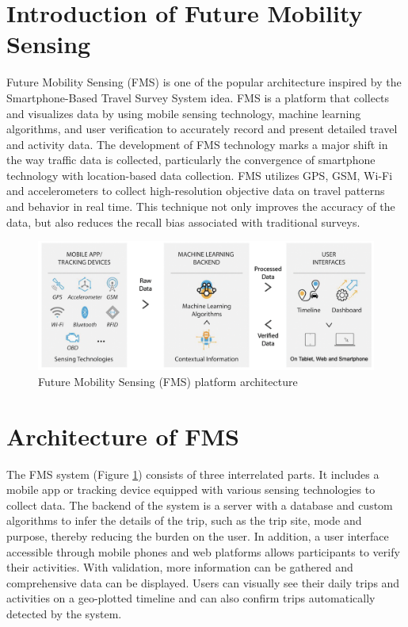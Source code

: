 \documentclass[12pt,two side]{report}
\begin{document}
\section{Introduction of Future Mobility Sensing}
Future Mobility Sensing (FMS) is one of the popular architecture inspired by the Smartphone-Based Travel Survey System idea. FMS is a platform that collects and visualizes data by using mobile sensing technology, machine learning algorithms, and user verification to accurately record and present detailed travel and activity data\cite{alho2022online}\cite{cottrill2013future}. The development of FMS technology marks a major shift in the way traffic data is collected, particularly the convergence of smartphone technology with location-based data collection. FMS utilizes GPS, GSM, Wi-Fi and accelerometers to collect high-resolution objective data on travel patterns and behavior in real time\cite{alho2022online}\cite{cottrill2013future}. This technique not only improves the accuracy of the data, but also reduces the recall bias associated with traditional surveys.
\begin{figure}
\centering
\includegraphics[width=16cm]{background_report/figures/FMS.png}
\caption{Future Mobility Sensing (FMS) platform architecture\cite{cottrill2013future}}
\label{figure:1}
\end{figure}
\section{Architecture of FMS}
The FMS system (Figure \ref{figure:1}) consists of three interrelated parts. It includes a mobile app or tracking device equipped with various sensing technologies to collect data\cite{cottrill2013future}. The backend of the system is a server with a database and custom algorithms to infer the details of the trip, such as the trip site, mode and purpose, thereby reducing the burden on the user\cite{cottrill2013future}. In addition, a user interface accessible through mobile phones and web platforms allows participants to verify their activities. With validation, more information can be gathered and comprehensive data can be displayed\cite{cottrill2013future}. Users can visually see their daily trips and activities on a geo-plotted timeline and can also confirm trips automatically detected by the system.
\end{document}
